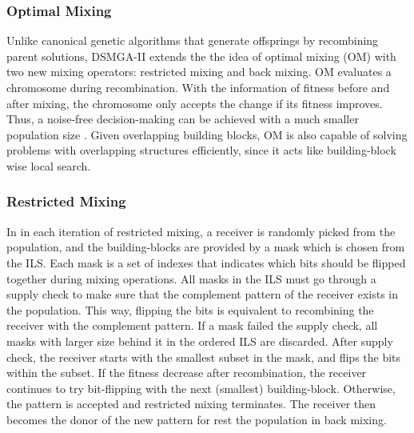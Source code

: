 \documentclass{sig-alternate-05-2015}
\begin{document}
\subsubsection{Optimal Mixing}
Unlike canonical genetic algorithms that generate offsprings by recombining parent solutions, DSMGA-II extends the the idea of optimal mixing (OM) \cite{thierens:OM} with two new mixing operators: restricted mixing and back mixing. OM evaluates a chromosome during recombination. With the information of fitness before and after mixing, the chromosome only accepts the change if its fitness improves. Thus, a noise-free decision-making can be achieved with a much smaller population size \cite{goldberg:buildingblock}. Given overlapping building blocks, OM is also capable of solving problems with overlapping structures efficiently, since it acts like building-block wise local search.


\subsubsection{Restricted Mixing}

In in each iteration of restricted mixing, a receiver is randomly picked from the population, and the building-blocks are provided by a mask which is chosen from the ILS. Each mask is a set of indexes that indicates which bits should be flipped together during mixing operations. All masks in the ILS must go through a supply check to make sure that the complement pattern of the receiver exists in the population. This way, flipping the bits is equivalent to recombining the receiver with the complement pattern. If a mask failed the supply check, all masks with larger size behind it in the ordered ILS are discarded. After supply check, the receiver starts with the smallest subset in the mask, and flips the bits within the subset. If the fitness decrease after recombination, the receiver continues to try bit-flipping with the next (smallest) building-block. Otherwise, the pattern is accepted and restricted mixing terminates. The receiver then becomes the donor of the new pattern for rest the population in back mixing. 
\end{document}
